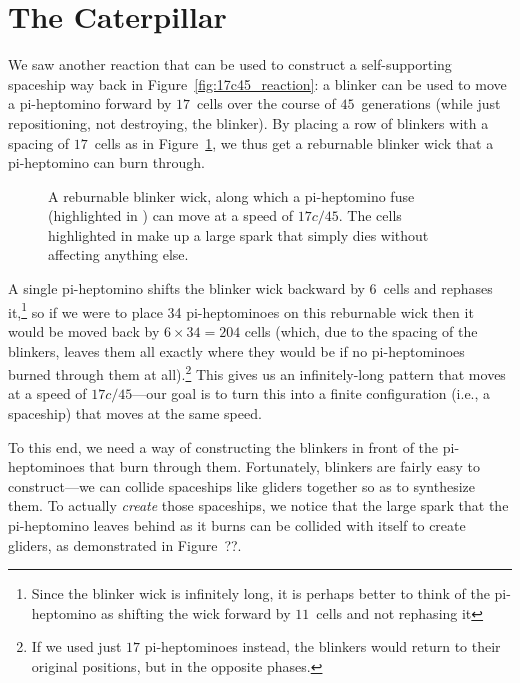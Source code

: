 \section{The Caterpillar}\label{sec:caterpillar}

We saw another reaction that can be used to construct a self-supporting spaceship way back in Figure~\ref{fig:17c45_reaction}: a blinker can be used to move a pi-heptomino forward by $17$~cells over the course of $45$~generations (while just repositioning, not destroying, the blinker). By placing a row of blinkers with a spacing of $17$~cells as in Figure~\ref{fig:reburnable_blinker_wick}, we thus get a reburnable blinker wick that a pi-heptomino can burn through.

\begin{figure}[!htb]
	\centering
	\caption{A reburnable blinker wick, along which a pi-heptomino fuse (highlighted in ) can move at a speed of $17c/45$. The cells highlighted in  make up a large spark that simply dies without affecting anything else.}\label{fig:reburnable_blinker_wick}
\end{figure}


A single pi-heptomino shifts the blinker wick backward by $6$~cells and rephases it,\footnote{Since the blinker wick is infinitely long, it is perhaps better to think of the pi-heptomino as shifting the wick forward by $11$~cells and not rephasing it} so if we were to place 34 pi-heptominoes on this reburnable wick then it would be moved back by $6 \times 34 = 204$ cells (which, due to the spacing of the blinkers, leaves them all exactly where they would be if no pi-heptominoes burned through them at all).\footnote{If we used just $17$ pi-heptominoes instead, the blinkers would return to their original positions, but in the opposite phases.} This gives us an infinitely-long pattern that moves at a speed of $17c/45$---our goal is to turn this into a finite configuration (i.e., a spaceship) that moves at the same speed.

To this end, we need a way of constructing the blinkers in front of the pi-heptominoes that burn through them. Fortunately, blinkers are fairly easy to construct---we can collide spaceships like gliders together so as to synthesize them. To actually \emph{create} those spaceships, we notice that the large spark that the pi-heptomino leaves behind as it burns can be collided with itself to create gliders, as demonstrated in Figure~??.

